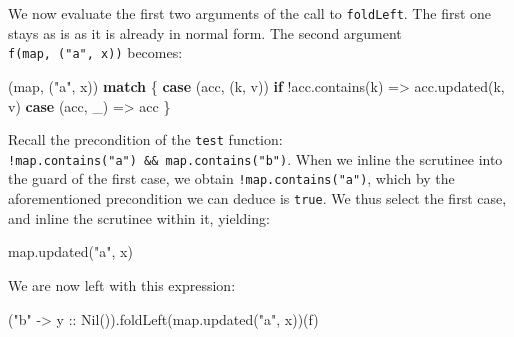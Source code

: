 \documentclass[ignorenonframetext,]{beamer}
\newenvironment{Shaded}{}{}
\newcommand{\FunctionTok}[1]{\textcolor[rgb]{0.02,0.16,0.49}{#1}}
\newcommand{\KeywordTok}[1]{\textcolor[rgb]{0.00,0.44,0.13}{\textbf{#1}}}
\newcommand{\NormalTok}[1]{#1}
\newcommand{\StringTok}[1]{\textcolor[rgb]{0.25,0.44,0.63}{#1}}
\begin{document}
\begin{frame}[fragile]

We now evaluate the first two arguments of the call to
\texttt{foldLeft}. The first one stays as is as it is already in normal
form. The second argument \texttt{f(map,\ ("a",\ x))} becomes:

\begin{Shaded}
\begin{Highlighting}[]
\NormalTok{(map, (}\StringTok{"a"}\NormalTok{, x)) }\KeywordTok{match}\NormalTok{ \{}
  \KeywordTok{case}\NormalTok{ (acc, (k, v)) }\KeywordTok{if}\NormalTok{ !acc.}\FunctionTok{contains}\NormalTok{(k) => acc.}\FunctionTok{updated}\NormalTok{(k, v)}
  \KeywordTok{case}\NormalTok{ (acc, _)                          => acc}
\NormalTok{\}}
\end{Highlighting}
\end{Shaded}

\end{frame}

\begin{frame}[fragile]

Recall the precondition of the \texttt{test} function:
\texttt{!map.contains("a")\ \&\&\ map.contains("b")}. When we inline the
scrutinee into the guard of the first case, we obtain
\texttt{!map.contains("a")}, which by the aforementioned precondition we
can deduce is \texttt{true}. We thus select the first case, and inline
the scrutinee within it, yielding:

\begin{Shaded}
\begin{Highlighting}[]
\NormalTok{map.}\FunctionTok{updated}\NormalTok{(}\StringTok{"a"}\NormalTok{, x)}
\end{Highlighting}
\end{Shaded}

\end{frame}

\begin{frame}[fragile]

We are now left with this expression:

\begin{Shaded}
\begin{Highlighting}[]
\NormalTok{(}\StringTok{"b"}\NormalTok{ -> y :: }\FunctionTok{Nil}\NormalTok{()).}\FunctionTok{foldLeft}\NormalTok{(map.}\FunctionTok{updated}\NormalTok{(}\StringTok{"a"}\NormalTok{, x))(f)}
\end{Highlighting}
\end{Shaded}

\end{frame}
\end{document}
